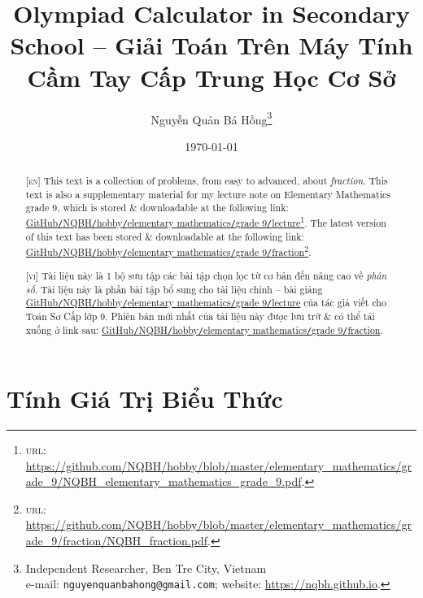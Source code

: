 \documentclass{article}
\title{Olympiad Calculator in Secondary School -- Giải Toán Trên Máy Tính Cầm Tay Cấp Trung Học Cơ Sở}
\author{Nguyễn Quản Bá Hồng\footnote{Independent Researcher, Ben Tre City, Vietnam\\e-mail: \texttt{nguyenquanbahong@gmail.com}; website: \url{https://nqbh.github.io}.}}
\date{\today}
\begin{document}
\maketitle
\begin{abstract}
	\textsc{[en]} This text is a collection of problems, from easy to advanced, about \textit{fraction}. This text is also a supplementary material for my lecture note on Elementary Mathematics grade 9, which is stored \& downloadable at the following link: \href{https://github.com/NQBH/hobby/blob/master/elementary_mathematics/grade_9/NQBH_elementary_mathematics_grade_9.pdf}{GitHub\texttt{/}NQBH\texttt{/}hobby\texttt{/}elementary mathematics\texttt{/}grade 9\texttt{/}lecture}\footnote{\textsc{url}: \url{https://github.com/NQBH/hobby/blob/master/elementary_mathematics/grade_9/NQBH_elementary_mathematics_grade_9.pdf}.}. The latest version of this text has been stored \& downloadable at the following link: \href{https://github.com/NQBH/hobby/blob/master/elementary_mathematics/grade_9/fraction/NQBH_fraction.pdf}{GitHub\texttt{/}NQBH\texttt{/}hobby\texttt{/}elementary mathematics\texttt{/}grade 9\texttt{/}fraction}\footnote{\textsc{url}: \url{https://github.com/NQBH/hobby/blob/master/elementary_mathematics/grade_9/fraction/NQBH_fraction.pdf}.}.
	\vspace{2mm}
	
	\textsc{[vi]} Tài liệu này là 1 bộ sưu tập các bài tập chọn lọc từ cơ bản đến nâng cao về \textit{phân số}. Tài liệu này là phần bài tập bổ sung cho tài liệu chính -- bài giảng \href{https://github.com/NQBH/hobby/blob/master/elementary_mathematics/grade_9/NQBH_elementary_mathematics_grade_9.pdf}{GitHub\texttt{/}NQBH\texttt{/}hobby\texttt{/}elementary mathematics\texttt{/}grade 9\texttt{/}lecture} của tác giả viết cho Toán Sơ Cấp lớp 9. Phiên bản mới nhất của tài liệu này được lưu trữ \& có thể tải xuống ở link sau: \href{https://github.com/NQBH/hobby/blob/master/elementary_mathematics/grade_9/fraction/NQBH_fraction.pdf}{GitHub\texttt{/}NQBH\texttt{/}hobby\texttt{/}elementary mathematics\texttt{/}grade 9\texttt{/}fraction}.
\end{abstract}
\tableofcontents


\section{Tính Giá Trị Biểu Thức}

\end{document}
